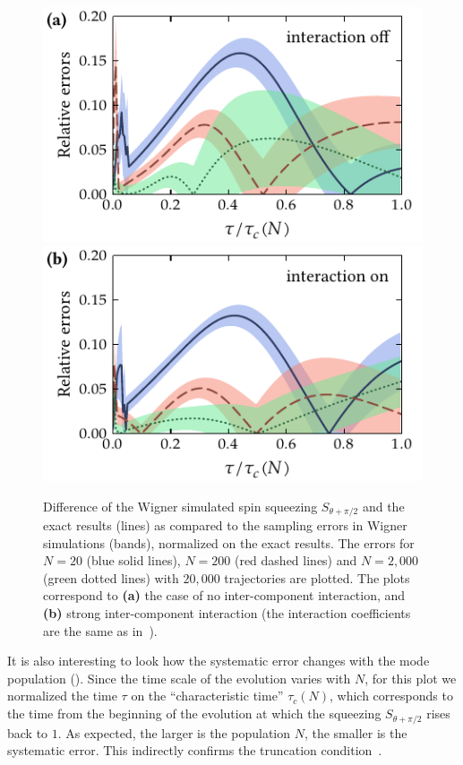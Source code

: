 \begin{figure}
    \centerline{%
    \includegraphics{figures_generated/exact/squeezing_nocc_N_err.pdf}%
    \includegraphics{figures_generated/exact/squeezing_cc_N_err.pdf}}

    \caption[Dependence of systematic errors in Wigner simulated spin squeezing on the particle number]{
    Difference of the Wigner simulated spin squeezing $S_{\theta+\pi/2}$ and the exact results (lines) as compared to the sampling errors in Wigner simulations (bands), normalized on the exact results.
    The errors for $N=20$ (blue solid lines), $N=200$ (red dashed lines) and $N=2,000$ (green dotted lines) with $20,000$ trajectories are plotted.
    The plots correspond to \textbf{(a)} the case of no inter-component interaction, and \textbf{(b)} strong inter-component interaction (the interaction coefficients are the same as in~).}%

    \label{fig:exact:squeezing-N-error-comparison}
\end{figure}

It is also interesting to look how the systematic error changes with the mode population ().
Since the time scale of the evolution varies with $N$, for this plot we normalized the time $\tau$ on the ``characteristic time'' $\tau_c(N)$, which corresponds to the time from the beginning of the evolution at which the squeezing $S_{\theta+\pi/2}$ rises back to $1$.
As expected, the larger is the population $N$, the smaller is the systematic error.
This indirectly confirms the truncation condition~.

